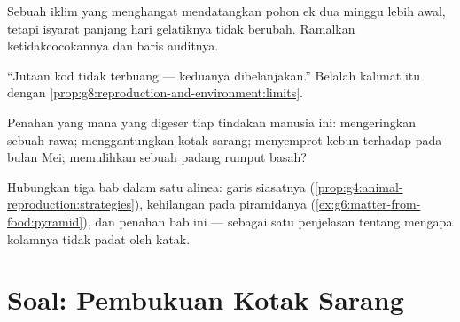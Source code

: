 \begin{exercise}[$\star\star$]\label{exo:g8:reproduction-and-environment:9}
Sebuah iklim yang menghangat mendatangkan  pohon ek dua minggu
lebih awal, tetapi isyarat panjang hari gelatiknya tidak berubah.
Ramalkan ketidakcocokannya dan baris auditnya.
\end{exercise}

\begin{exercise}[$\star\star$]\label{exo:g8:reproduction-and-environment:10}
``Jutaan   kod tidak terbuang --- keduanya dibelanjakan.''
Belalah kalimat itu dengan
\cref{prop:g8:reproduction-and-environment:limits}.
\end{exercise}

\begin{exercise}[$\star\star$]\label{exo:g8:reproduction-and-environment:11}
Penahan yang mana yang digeser tiap tindakan manusia ini: mengeringkan
sebuah rawa; menggantungkan kotak sarang; menyemprot kebun 
terhadap  pada bulan Mei; memulihkan sebuah padang rumput basah?
\end{exercise}

\begin{exercise}[$\star\star\star$]\label{exo:g8:reproduction-and-environment:12}
Hubungkan tiga bab dalam satu alinea: garis siasatnya
(\cref{prop:g4:animal-reproduction:strategies}), kehilangan pada
piramidanya (\cref{ex:g6:matter-from-food:pyramid}), dan penahan bab
ini --- sebagai satu penjelasan tentang mengapa kolamnya tidak padat
oleh katak.
\end{exercise}

\section{Soal: Pembukuan Kotak Sarang}

